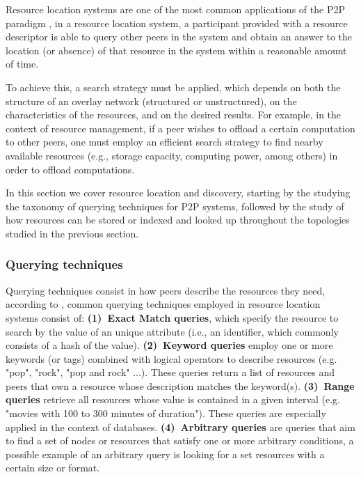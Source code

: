 

Resource location systems are one of the most common applications of the P2P paradigm \cite{leitaoPHDthesis}, in a resource location system, a participant provided with a resource descriptor is able to query other peers in the system and obtain an answer to the location (or absence) of that resource in the system within a reasonable amount of time.

To achieve this, a search strategy must be applied, which depends on both the structure of an overlay network (structured or unstructured), on the characteristics of the resources, and on the desired results. For example, in the context of resource management, if a peer wishes to offload a certain computation to other peers, one must employ an efficient search strategy to find nearby available resources (e.g., storage capacity, computing power, among others) in order to offload computations.

In this section we cover resource location and discovery, starting by the studying the taxonomy of querying techniques for P2P systems, followed by the study of how resources can be stored or indexed and looked up throughout the topologies studied in the previous section.

\subsubsection*{Querying techniques}

Querying techniques consist in how peers describe the resources they need, according to \cite{leitaoPHDthesis}, common querying techniques employed in resource location systems consist of: \textbf{(1)~Exact Match queries}, which specify the resource to search by the value of an unique attribute (i.e., an identifier, which commonly consists of a hash of the value). \textbf{(2)~Keyword queries} employ one or more keywords (or tags) combined with logical operators to describe resources (e.g. "pop", "rock", "pop and rock" ...). These queries return a list of resources and peers that own a resource whose description matches the keyword(s). \textbf{(3)~Range queries} retrieve all resources whose value is contained in a given interval (e.g. "movies with 100 to 300 minutes of duration"). These queries are especially applied in the context of databases. \textbf{(4)~Arbitrary queries} are queries that aim to find a set of nodes or resources that satisfy one or more arbitrary conditions, a possible example of an arbitrary query is looking for a set resources with a certain size or format.

